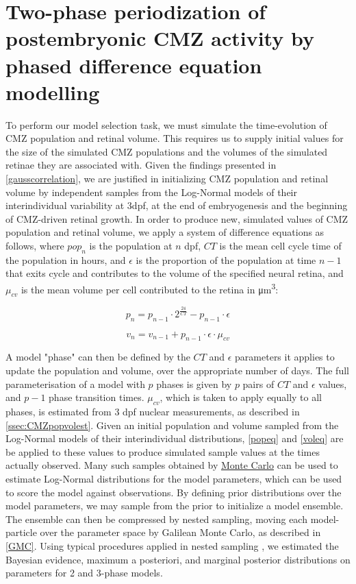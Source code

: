 \section{Two-phase periodization of postembryonic CMZ activity by phased difference equation modelling}
\label{sec:phaseGMC}
To perform our model selection task, we must simulate the time-evolution of CMZ population and retinal volume. This requires us to supply initial values for the size of the simulated CMZ populations and the volumes of the simulated retinae they are associated with. Given the findings presented in \autoref{gausscorrelation}, we are justified in initializing CMZ population and retinal volume by independent samples from the Log-Normal models of their interindividual variability at 3dpf, at the end of embryogenesis and the beginning of CMZ-driven retinal growth. In order to produce new, simulated values of CMZ population and retinal volume, we apply a system of difference equations as follows, where $pop_n$ is the population at $n$ dpf, $CT$ is the mean cell cycle time of the population in hours, and $\epsilon$ is the proportion of the population at time $n-1$ that exits cycle and contributes to the volume of the specified neural retina, and $\mu_{cv}$ is the mean volume per cell contributed to the retina in \si{\cubic\micro\metre}:

\begin{equation}
    p_n=p_{n-1} \cdot 2^{\frac{24}{CT}} - p_{n-1} \cdot \epsilon
    \label{popeq}
\end{equation}

\begin{equation}
    v_n=v_{n-1} + p_{n-1} \cdot \epsilon \cdot \mu_{cv}
    \label{voleq}
\end{equation}

A model "phase" can then be defined by the $CT$ and $\epsilon$ parameters it applies to update the population and volume, over the appropriate number of days. The full parameterisation of a model with $p$ phases is given by $p$ pairs of $CT$ and $\epsilon$ values, and $p-1$ phase transition times. $\mu_{cv}$, which is taken to apply equally to all phases, is estimated from 3 dpf nuclear measurements, as described in \autoref{ssec:CMZpopvolest}. Given an initial population and volume sampled from the Log-Normal models of their interindividual distributions, \autoref{popeq} and \autoref{voleq} are be applied to these values to produce simulated sample values at the times actually observed. Many such samples obtained by \hyperref[ssec:Montecarlo]{Monte Carlo} can be used to estimate Log-Normal distributions for the model parameters, which can be used to score the model against observations. By defining prior distributions over the model parameters, we may sample from the prior to initialize a model ensemble. The ensemble can then be compressed by nested sampling, moving each model-particle over the parameter space by Galilean Monte Carlo, as described in \autoref{GMC}. Using typical procedures applied in nested sampling \cite{Skilling2006}, we estimated the Bayesian evidence, maximum a posteriori, and marginal posterior distributions on parameters for 2 and 3-phase models.

